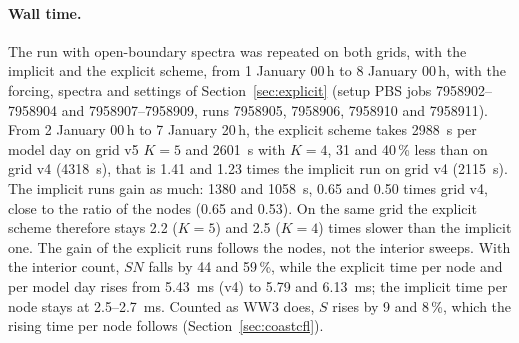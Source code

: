 \documentclass[11pt,a4paper]{article}
\begin{document}
\paragraph{Wall time.} The run with open-boundary spectra was repeated on
both grids, with the implicit and the explicit scheme, from 1 January
00\,h to 8 January 00\,h, with the forcing, spectra and settings of
Section~\ref{sec:explicit} (setup PBS jobs 7958902--7958904 and
7958907--7958909, runs 7958905, 7958906, 7958910 and 7958911). From 2
January 00\,h to 7 January 20\,h, the explicit scheme takes \SI{2988}{s}
per model day on grid v5 $K=5$ and \SI{2601}{s} with $K=4$, 31 and
40\,\% less than on grid v4 (\SI{4318}{s}), that is 1.41 and 1.23 times
the implicit run on grid v4 (\SI{2115}{s}). The implicit runs gain as
much: 1380 and \SI{1058}{s}, 0.65 and 0.50 times grid v4, close to the
ratio of the nodes (0.65 and 0.53). On the same grid the explicit scheme
therefore stays 2.2 ($K=5$) and 2.5 ($K=4$) times slower than the implicit
one. The gain of the explicit runs follows the nodes, not the interior
sweeps. With the interior count, $S N$ falls by 44 and 59\,\%, while the
explicit time per node and per model day rises from \SI{5.43}{ms} (v4) to
5.79 and \SI{6.13}{ms}; the implicit time per node stays at
2.5--\SI{2.7}{ms}. Counted as WW3 does, $S$ rises by 9 and 8\,\%, which
the rising time per node follows (Section~\ref{sec:coastcfl}).
\end{document}
